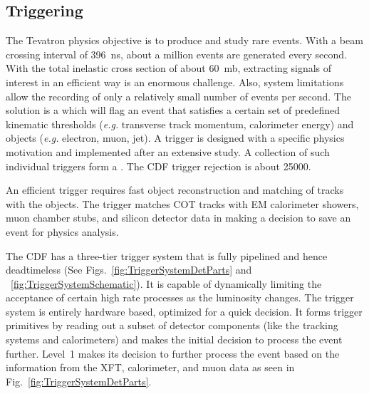 \subsection{Triggering}\label{triggering}
The Tevatron physics objective is to produce and study rare events. With a beam crossing interval of 396~ns, about a million events are generated every second. With the total inelastic cross section of about 60~mb, extracting signals of interest in an efficient way is an enormous challenge. Also, system limitations allow the recording of only a relatively small number of events per second. The solution is a  which will flag an event that satisfies a certain set of predefined kinematic thresholds (\textit{e.g.} transverse track momentum, calorimeter energy) and objects (\textit{e.g.} electron, muon, jet). A trigger is designed with a specific physics motivation and implemented after an extensive study. A collection of such individual triggers form a . The CDF trigger rejection is about 25000.

An efficient trigger requires fast object reconstruction and matching of tracks with the objects. The trigger matches COT tracks with EM calorimeter showers, muon chamber stubs, and silicon detector data in making a decision to save an event for physics analysis.

The CDF has a three-tier trigger system that is fully pipelined and hence deadtimeless (See Figs.~\ref{fig:TriggerSystemDetParts} and ~\ref{fig:TriggerSystemSchematic}). It is capable of dynamically limiting the acceptance of certain high rate processes as the luminosity changes. The  trigger system is entirely hardware based, optimized for a quick decision. It forms trigger primitives by reading out a subset of detector components (like the tracking systems and calorimeters) and makes the initial decision to process the event further. Level~1 makes its decision to further process the event based on the information from the XFT, calorimeter, and muon data as seen in Fig.~\ref{fig:TriggerSystemDetParts}.

